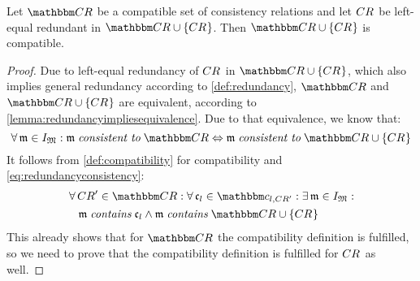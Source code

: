 \begin{theorem} \label{theorem:redundancycompatibility}
    Let $\consistencyrelationset{CR}$ be a compatible set of consistency relations and let $\consistencyrelation{CR}{}$ be left-equal redundant in $\consistencyrelationset{CR} \cup \setted{\consistencyrelation{CR}{}}$. Then $\consistencyrelationset{CR} \cup \setted{\consistencyrelation{CR}{}}$ is compatible. 
\end{theorem}
%
\begin{proof}
    Due to left-equal redundancy of $\consistencyrelation{CR}{}$ in $\consistencyrelationset{CR} \cup \setted{\consistencyrelation{CR}{}}$, which also implies general redundancy according to \autoref{def:redundancy}, $\consistencyrelationset{CR}$ and $\consistencyrelationset{CR} \cup \setted{\consistencyrelation{CR}{}}$ are equivalent, according to \autoref{lemma:redundancyimpliesequivalence}.
    Due to that equivalence, we know that: %
    \begin{equation} \label{eq:redundancyconsistency}
        \forall \modeltuple{m} \in \metamodeltupleinstanceset{M}: \modeltuple{m} \consistenttomath \consistencyrelationset{CR} \equivalent     \modeltuple{m} \consistenttomath \consistencyrelationset{CR} \cup \setted{\consistencyrelation{CR}{}}
    \end{equation}
    It follows from \autoref{def:compatibility} for compatibility and \autoref{eq:redundancyconsistency}:
    \begin{align} \label{eq:redundancycompatibleexisting}
        & \nonumber
        \forall \consistencyrelation{CR}{}' \in \consistencyrelationset{CR} : \forall \conditionelement{c}{l} \in \condition{c}{l, \consistencyrelation{CR}{}'} %
        : \exists \modeltuple{m} \in \metamodeltupleinstanceset{M} : \\
        & \formulaskip
        \modeltuple{m} \containsmath \conditionelement{c}{l} \land \modeltuple{m} \containsmath \consistencyrelationset{CR} \cup \setted{\consistencyrelation{CR}{}}
    \end{align}
    This already shows that for $\consistencyrelationset{CR}$ the compatibility definition is fulfilled, so we need to prove that the compatibility definition is fulfilled for $\consistencyrelation{CR}{}$ as well.

\end{proof}
